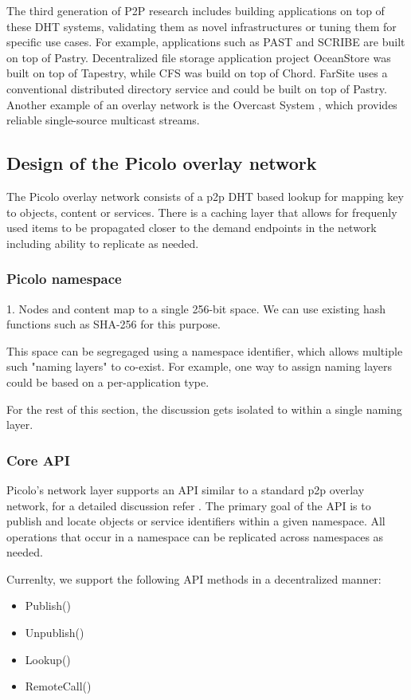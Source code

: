 The third generation of P2P research includes building applications on top of these DHT systems, validating them as
novel infrastructures or tuning them for specific use cases. For example, applications such as PAST \cite{past} and
SCRIBE \cite{scribe} are built on top of Pastry. Decentralized file storage application project OceanStore \cite{oceanstore} was built
on top of Tapestry, while CFS \cite{cfs} was build on top of Chord. FarSite \cite{farsite} uses a conventional
distributed directory service and could be built on top of Pastry. Another example of an overlay network is the Overcast
System \cite{overcast}, which provides reliable single-source multicast streams.

\subsection{Design of the Picolo overlay network}

The Picolo overlay network consists of a p2p DHT based lookup for mapping key to objects, content or services. There is a caching layer that allows for frequenly used items to be propagated closer to the demand endpoints in the network including ability to replicate as needed.

\subsubsection{Picolo namespace} 
1. Nodes and content map to a single 256-bit space. We can use existing hash functions such as SHA-256 for this purpose.

This space can be segregaged using a namespace identifier, which allows multiple such "naming layers" to co-exist. For example, one way to assign naming layers could be based on a per-application type.

For the rest of this section, the discussion gets isolated to within a single naming layer.

\subsubsection{Core API}
Picolo's network layer supports an API similar to a standard p2p overlay network, for a detailed discussion refer
\cite{dolr2003}. The primary goal of the API is to publish and locate objects or service identifiers within a given
namespace. All operations that occur in a namespace can be replicated across namespaces as needed.

Currenlty, we support the following API methods in a decentralized manner:
\begin{itemize}
    \item Publish()
    \item Unpublish()
    \item Lookup()
    \item RemoteCall()
\end{itemize}

